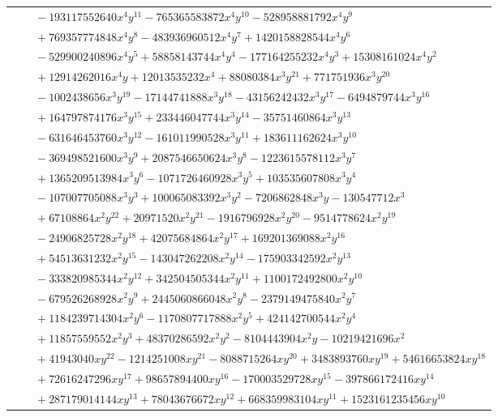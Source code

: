 \documentclass[11pt]{article}
\begin{document}
\begin{longtable}{@{}ll@{}}
 & $\quad -193117552640x^{4}y^{11}-765365583872x^{4}y^{10}-528958881792x^{4}y^{9}$\\
 & $\quad +769357774848x^{4}y^{8}-483936960512x^{4}y^{7}+1420158828544x^{4}y^{6}$\\
 & $\quad -529900240896x^{4}y^{5}+58858143744x^{4}y^{4}-177164255232x^{4}y^{3}+15308161024x^{4}y^{2}$\\
 & $\quad +12914262016x^{4}y+12013535232x^{4}+88080384x^{3}y^{21}+771751936x^{3}y^{20}$\\
 & $\quad -1002438656x^{3}y^{19}-17144741888x^{3}y^{18}-43156242432x^{3}y^{17}-6494879744x^{3}y^{16}$\\
 & $\quad +164797874176x^{3}y^{15}+233446047744x^{3}y^{14}-35751460864x^{3}y^{13}$\\
 & $\quad -631646453760x^{3}y^{12}-161011990528x^{3}y^{11}+183611162624x^{3}y^{10}$\\
 & $\quad -369498521600x^{3}y^{9}+2087546650624x^{3}y^{8}-1223615578112x^{3}y^{7}$\\
 & $\quad +1365209513984x^{3}y^{6}-1071726460928x^{3}y^{5}+103535607808x^{3}y^{4}$\\
 & $\quad -107007705088x^{3}y^{3}+100065083392x^{3}y^{2}-7206862848x^{3}y-130547712x^{3}$\\
 & $\quad +67108864x^{2}y^{22}+20971520x^{2}y^{21}-1916796928x^{2}y^{20}-9514778624x^{2}y^{19}$\\
 & $\quad -24906825728x^{2}y^{18}+42075684864x^{2}y^{17}+169201369088x^{2}y^{16}$\\
 & $\quad +54513631232x^{2}y^{15}-143047262208x^{2}y^{14}-175903342592x^{2}y^{13}$\\
 & $\quad -333820985344x^{2}y^{12}+342504505344x^{2}y^{11}+1100172492800x^{2}y^{10}$\\
 & $\quad -679526268928x^{2}y^{9}+2445060866048x^{2}y^{8}-2379149475840x^{2}y^{7}$\\
 & $\quad +1184239714304x^{2}y^{6}-1170807717888x^{2}y^{5}+424142700544x^{2}y^{4}$\\
 & $\quad +11857559552x^{2}y^{3}+48370286592x^{2}y^{2}-8104443904x^{2}y-10219421696x^{2}$\\
 & $\quad +41943040xy^{22}-1214251008xy^{21}-8088715264xy^{20}+3483893760xy^{19}+54616653824xy^{18}$\\
 & $\quad +72616247296xy^{17}+98657894400xy^{16}-170003529728xy^{15}-397866172416xy^{14}$\\
 & $\quad +287179014144xy^{13}+78043676672xy^{12}+668359983104xy^{11}+1523161235456xy^{10}$\\

\end{longtable}
\end{document}
